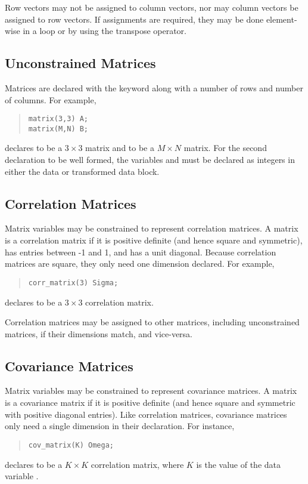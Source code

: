 Row vectors may not be assigned to column vectors, nor may column
vectors be assigned to row vectors.  If assignments are required, they
may be done element-wise in a loop or by using the transpose operator.

\subsection{Unconstrained Matrices}

Matrices are declared with the keyword  along with a
number of rows and number of columns.  For example, 
%
\begin{quote}
\begin{Verbatim}  
matrix(3,3) A;  
matrix(M,N) B;
\end{Verbatim}
\end{quote}
%  
declares  to be a $3 \times 3$ matrix and  to be a $M
\times N$ matrix.  For the second declaration to be well formed, the
variables  and  must be declared as integers in either
the data or transformed data block.

\subsection{Correlation Matrices}

Matrix variables may be constrained to represent correlation matrices.
A matrix is a correlation matrix if it is positive definite (and hence
square and symmetric), has entries between -1 and 1, and has a unit
diagonal.  Because correlation matrices are square, they only need one
dimension declared.  For example,
%
\begin{quote}
\begin{Verbatim} 
corr_matrix(3) Sigma;
\end{Verbatim}
\end{quote}
% 
declares  to be a $3 \times 3$ correlation matrix.

Correlation matrices may be assigned to other matrices, including
unconstrained matrices, if their dimensions match, and vice-versa.

\subsection{Covariance Matrices}

Matrix variables may be constrained to represent covariance matrices.
A matrix is a covariance matrix if it is positive definite (and hence
square and symmetric with positive diagonal entries).  Like
correlation matrices, covariance matrices only need a single dimension
in their declaration.  For instance,
%
\begin{quote}
\begin{Verbatim} 
cov_matrix(K) Omega;
\end{Verbatim}
\end{quote}
% 
declares  to be a $K \times K$ correlation matrix, where
$K$ is the value of the data variable .

